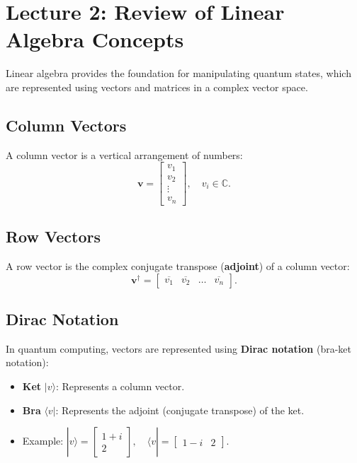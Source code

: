 \section{Lecture 2: Review of Linear Algebra Concepts}

Linear algebra provides the foundation for manipulating quantum states, which
are represented using vectors and matrices in a complex vector space.


\subsection*{Column Vectors}
A column vector is a vertical arrangement of numbers:
\[
  \mathbf{v} =
  \begin{bmatrix}
    v_1 \\
    v_2 \\
    \vdots \\
    v_n
  \end{bmatrix}, \quad v_i \in \mathbb{C}.
\]

\subsection*{Row Vectors}
A row vector is the complex conjugate transpose (\textbf{adjoint}) of a
column vector:
\[
  \mathbf{v}^\dagger =
  \begin{bmatrix}
    \overline{v_1} & \overline{v_2} & \dots & \overline{v_n}
  \end{bmatrix}.
\]

\subsection*{Dirac Notation}
In quantum computing, vectors are represented using \textbf{Dirac notation}
(bra-ket notation):
\begin{itemize}
  \item \textbf{Ket} \( |v\rangle \): Represents a column vector.
  \item \textbf{Bra} \( \langle v | \): Represents the adjoint (conjugate
    transpose) of the ket.
  \item Example: \( |v\rangle = \begin{bmatrix} 1 + i \\ 2 \end{bmatrix},
    \quad \langle v | = \begin{bmatrix} 1 - i & 2 \end{bmatrix} \).
\end{itemize}


